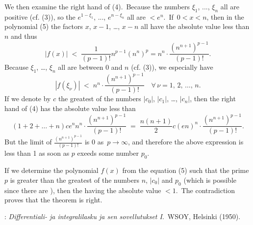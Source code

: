 \documentclass[12pt]{article}
\theoremstyle{definition}
\begin{document}
We then examine the right hand  of (4).\, Because the numbers $\xi_1$, ..., $\xi_n$ all are positive (cf. (3)), so the  $e^{1-\xi_1}$, ..., $e^{n-\xi_n}$ all are $< e^n$.\, If\, $0 < x < n$, then in the polynomial (5) the factors $x$,
$x\!-\!1$, \ldots, $x\!-\!n$ all have the absolute value less than $n$ and thus
$$|f(x)| \;<\; \frac{1}{(p\!-\!1)!}n^{p-1}(n^n)^p = n^n\cdot\frac{(n^{n+1})^{p-1}}{(p\!-\!1)!}.$$
Because $\xi_1$, \ldots, $\xi_n$ all are between 0 and $n$ (cf. (3)), we especially have
$$|f(\xi_{\nu})| \;<\; n^n\cdot\frac{(n^{n+1})^{p-1}}{(p\!-\!1)!}
\quad\forall \,\nu = 1,\,2,\,\ldots,\,n.$$
If we denote by $c$ the greatest of the numbers $|c_0|$, $|c_1|$, \ldots, $|c_n|$, then the right hand  of (4) has the absolute value less than
$$(1\!+\!2\!+\!\ldots\!+\!n)ce^nn^n\cdot\frac{(n^{n+1})^{p-1}}{(p\!-\!1)!}
\;=\; \frac{n(n\!+\!1)}{2}c(en)^n\cdot\frac{(n^{n+1})^{p-1}}{(p\!-\!1)!}.$$
But the limit of $\frac{(n^{n+1})^{p-1}}{(p\!-\!1)!}$ is 0 as\, $p\to\infty$, and therefore the above expression is less than 1 as soon as $p$ exeeds some number $p_0$.

If we determine the polynomial $f(x)$ from the equation (5) such that the prime $p$ is greater than the greatest of the numbers $n$, $|c_0|$ and $p_0$ (which is possible since there are ), then the  having the absolute value $< 1$.\, The contradiction proves that the theorem is right.

\begin{thebibliography}{8}
: {\em Differentiali- ja integralilasku
ja sen sovellutukset I}.\, WSOY, Helsinki (1950).
\end{thebibliography} 


\end{document}
